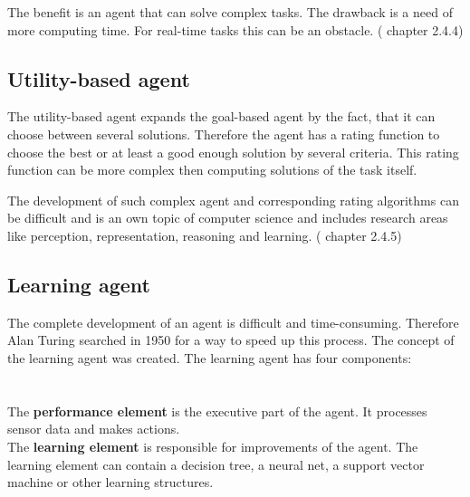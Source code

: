 \documentclass[10pt,a4paper,DIV=11]{scrreprt}
\begin{document}
The benefit is an agent that can solve complex tasks. The drawback is a need of more computing time. For real-time tasks this can be an obstacle.
(\cite{ai} chapter 2.4.4)

\subsection{Utility-based agent}
The utility-based agent expands the goal-based agent by the fact, that it can choose between several solutions. Therefore the agent has a rating function to choose the best or at least a good enough solution by several criteria. This rating function can be more complex then computing solutions of the task itself.

The development of such complex agent and corresponding rating algorithms can be difficult and is an own topic of computer science and includes research areas like perception, representation, reasoning and learning.
(\cite{ai} chapter 2.4.5)

\subsection{Learning agent}
The complete development of an agent is difficult and time-consuming. Therefore Alan Turing searched in 1950 for a way to speed up this process.\cite{turing} The concept of the learning agent was created. The learning agent has four components: \\

   \\
\\

The \textbf{performance element} is the executive part of the agent. It processes sensor data and makes actions. \\

The \textbf{learning element} is responsible for improvements of the agent. The learning element can contain a decision tree, a neural net, a support vector machine or other learning structures. \\
\end{document}
